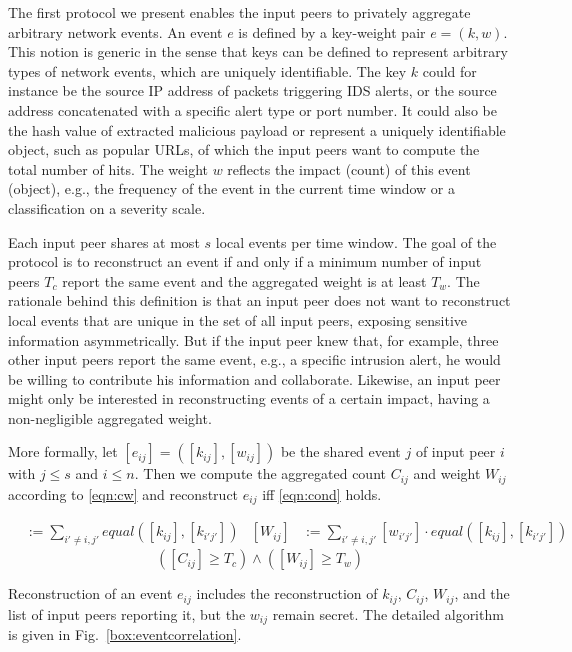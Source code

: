 \documentclass[letterpaper,11pt,onecolumn,titlepage]{article}
\begin{document}
The first protocol we present enables the input peers to privately aggregate arbitrary network events.
An event $e$ is defined by a key-weight pair $e=(k, w)$. This notion is generic in the sense that keys can be defined to represent arbitrary types of network events, which are uniquely identifiable. The key $k$ could for instance be the source IP address of packets triggering IDS alerts, or the source address concatenated with a specific alert type or port number. It could also be the hash value of extracted malicious payload or represent a uniquely identifiable object, such as popular URLs, of which the input peers want to compute the total number of hits. The weight $w$ reflects the impact (count) of this event (object), e.g., the frequency of the event in the current time window or a classification on a severity scale.

Each input peer shares at most $s$ local events per time window. The goal of the protocol is to reconstruct an event if and only if a minimum number of input peers $T_c$ report the same event and the aggregated weight is at least $T_w$. The rationale behind this definition is that an input peer does not want to reconstruct local events that are unique in the set of all input peers, exposing sensitive information asymmetrically. But if
the input peer knew that, for example, three other input peers report the same event, e.g., a specific intrusion alert, he would be willing to contribute his information
and collaborate. Likewise, an input peer might only be interested in reconstructing events of a certain impact, having a non-negligible aggregated weight. 


More formally, let $[e_{ij}]=([k_{ij}], [w_{ij}])$ be the shared event $j$ of input peer $i$ with $j \leq s$ and $i \leq n$. Then we compute the aggregated count $C_{ij}$ and weight $W_{ij}$ according to \eqref{eqn:cw} and reconstruct $e_{ij}$ iff \eqref{eqn:cond} holds.

\begin{align}
[C_{ij}] &:= \sum_{i' \neq i, j'}{equal([k_{ij}], [k_{i'j'}])}  &  [W_{ij}] &:= \sum_{i' \neq i, j'}{[w_{i'j'}] \cdot equal([k_{ij}], [k_{i'j'}])} \label{eqn:cw}
\end{align}
\begin{equation}
	([C_{ij}] \geq T_c) \wedge ([W_{ij}] \geq T_w) \label{eqn:cond}
\end{equation}


Reconstruction of an event $e_{ij}$ includes the reconstruction of $k_{ij}$, $C_{ij}$, $W_{ij}$, and the list of input peers reporting it, but the $w_{ij}$ remain secret. The detailed algorithm is given in Fig.~\ref{box:eventcorrelation}.
\end{document}
